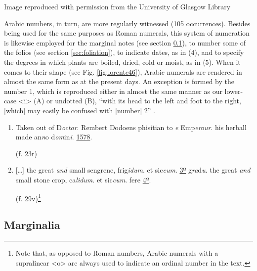 \documentclass{article}
\begin{document}
 Image reproduced with permission from the University of Glasgow Library 


 
Arabic numbers, in turn, are more regularly witnessed (105 occurrences). Besides being used for the same purposes as Roman numerals, this
system of numeration is likewise employed for the marginal notes (see
section \ref{sec:marginalia}), to number some of the folios (see section \ref{sec:foliation}), to
indicate dates, as in (4), and to specify the degrees in which plants
are boiled, dried, cold or moist, as in (5). When it comes to their
shape (see Fig. \ref{fig:lorente46}), Arabic numerals are rendered in almost the same form as at
the present days. An exception is formed by the number 1, which is reproduced either in almost
the same manner as our lower-case \textless i\textgreater{} (A) or
undotted (B), ``with its head to the left and foot to the right,
{[}which{]} may easily be confused with {[}number{]} 2'' \citep[268]{jenkinson_use_1926} .

\begin{enumerate}
\def\labelenumi{(\arabic{enumi})}
\setcounter{enumi}{3}
\item\label{lorente:numlist:4}
Taken out of D\emph{octor}. Rembert Dodoens phisitian to \th\emph{e}
Emp\emph{erour}. his herball made an\emph{n}o d\emph{om}in\emph{i}.
\uline{1578}. 
\begin{flushright}
    (f. 23r)
\end{flushright}

\item\label{lorente:numlist:5}
{[}\ldots{]} the great \emph{and} small sengrene, frig\emph{idum}.
et sic\emph{cum}. \uline{3º} g\emph{ra}d\emph{u}. the great \emph{and}
small stone crop, ca\emph{lidum}. et sic\emph{cum}. fere \uline{4º}.
\begin{flushright}
    (f. 29v)\footnote{Note that, as opposed to Roman numbers, Arabic
  numerals with a supralinear \textless o\textgreater{} are always used
  to indicate an ordinal number in the text.}
\end{flushright}

\end{enumerate}

\subsection{Marginalia}\label{sec:marginalia}
\end{document}
